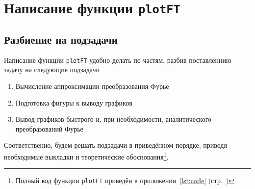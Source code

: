\documentclass[11pt, oneside, final]{article}
\theoremstyle{break}
\numberwithin{equation}{section}
\theoremstyle{plain}
\theoremstyle{definition}
\begin{document}
    \section{Написание функции \texttt{plotFT} } %
    \label{sec:programm}
    \subsection{Разбиение на подзадачи} %
    \label{sub:tasks}
    Написание функции \texttt{plotFT} удобно делать по частям, разбив поставленнию задачу на следующие подзадачи
    \begin{enumerate}
        \item Вычисление аппроксимации преобразования Фурье
        \item Подготовка фигуры к выводу графиков
        \item Вывод графиков быстрого и, при необходимости, аналитического преобразований Фурье 
    \end{enumerate}
    Соответственно, будем решать подзадачи в приведённом порядке, приводя необходимые выкладки и теоретические обоснования\footnote{Полный код функции \texttt{plotFT} приведён в приложении~\ref{lst:code} (стр.~\pageref{lst:code})}.
\end{document}
